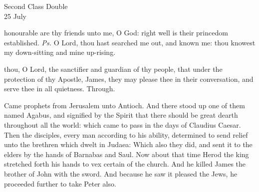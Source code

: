 \begin{inhead}
    {Second Class Double\\
25 July}
\end{inhead}
\par\noindent
{}


\introit
{} honourable are thy friends unto me, O God: right well is their princedom established. \textit{Ps.} O Lord, thou hast searched me out, and known me: thou knowest my down-sitting and mine up-rising.

\collect
 thou, O Lord, the sanctifier and guardian of thy people, that under the protection of thy Apostle, James, they may please thee in their conversation, and serve thee in all quietness. Through.

 Came prophets from Jerusalem unto Antioch. And there stood up one of them named Agabus, and signified by the Spirit that there should be great dearth throughout all the world: which came to pass in the days of Claudius Caesar. Then the disciples, every man according to his ability, determined to send relief unto the brethren which dwelt in Judaea: Which also they did, and sent it to the elders by the hands of Barnabas and Saul. Now about that time Herod the king stretched forth his hands to vex certain of the church. And he killed James the brother of John with the sword. And because he saw it pleased the Jews, he proceeded further to take Peter also.

